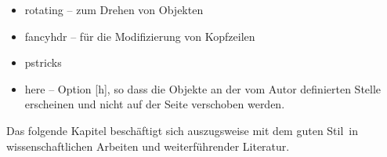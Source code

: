 \begin{itemize}
\begin{itemize}
        \item{rotating} -- zum Drehen von Objekten

        \item{fancyhdr} -- für die Modifizierung von Kopfzeilen

        \item{pstricks}

        \item{here} -- Option [h], so dass die Objekte an der vom Autor definierten Stelle erscheinen und nicht auf der Seite verschoben werden.

    \end{itemize}

\end{itemize}

Das folgende Kapitel beschäftigt sich auszugsweise mit dem \glqq guten Stil\grqq \ in wissenschaftlichen Arbeiten und weiterführender Literatur.
